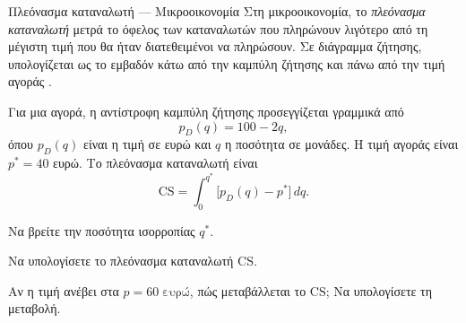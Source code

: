 \begin{problhma}{Πλεόνασμα καταναλωτή --- Μικροοικονομία}
Στη μικροοικονομία, το \emph{πλεόνασμα καταναλωτή} μετρά το όφελος των
καταναλωτών που πληρώνουν λιγότερο από τη μέγιστη τιμή που θα ήταν
διατεθειμένοι να πληρώσουν. Σε διάγραμμα ζήτησης, υπολογίζεται ως το
εμβαδόν κάτω από την καμπύλη ζήτησης και πάνω από την τιμή αγοράς
\cite{consumerSurplusEconomic}.

Για μια αγορά, η αντίστροφη καμπύλη ζήτησης προσεγγίζεται γραμμικά από
\[
  p_D(q)=100-2q,
\]
όπου \(p_D(q)\) είναι η τιμή σε ευρώ και \(q\) η ποσότητα σε μονάδες.
Η τιμή αγοράς είναι \(p^*=40\) ευρώ. Το πλεόνασμα καταναλωτή είναι
\[
  \mathrm{CS} = \int_0^{q^*}\bigl[p_D(q)-p^*\bigr]\,dq.
\]
\begin{alist}
  \item Να βρείτε την ποσότητα ισορροπίας $q^*$.
  \item Να υπολογίσετε το πλεόνασμα καταναλωτή $\mathrm{CS}$.
  \item Αν η τιμή ανέβει στα $p = 60\;\text{ευρώ}$, πώς μεταβάλλεται
        το $\mathrm{CS}$; Να υπολογίσετε τη μεταβολή.
\end{alist}


\end{problhma}
